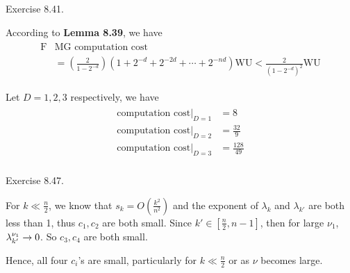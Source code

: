 \documentclass{homework}
\begin{document}
\question Exercise 8.41.
	
	According to \textbf{Lemma 8.39}, we have 
	\begin{eqnarray}
		\begin{aligned}
			\text{F}&\text{MG computation cost} \\
			&=(\frac{2}{1-2^{-d}})(1+2^{-d}+2^{-2d}+\cdots+2^{-nd})\text{WU} < 
			\frac{2}{(1-2^{-d})^2}\text{WU}
		\end{aligned}
	\end{eqnarray}
	
	Let $D = 1,2,3$ respectively, we have 
	\begin{eqnarray}
		\begin{aligned}
			\text{computation cost}|_{D=1} &= 8 \\
			\text{computation cost}|_{D=2} &= \frac{32}{9} \\
			\text{computation cost}|_{D=3} &= \frac{128}{49} \\
		\end{aligned}
	\end{eqnarray}
	
\question Exercise 8.47.

	For $k \ll \frac{n}{2}$, we know that $s_k = O(\frac{k^2}{n^2})$ and the exponent of $\lambda_k$ and $\lambda_{k'}$ are both less than 1, thus $c_1,c_2$ are both small. Since $k'\in[\frac{n}{2},n-1]$, then for large $\nu_1$, $\lambda_{k'}^{\nu_1} \rightarrow 0$. So $c_3, c_4$ are both small.
	
	Hence, all four $c_i$'s are small, particularly for $k \ll \frac{n}{2}$ or as $\nu$ becomes large.
	
\end{document}
